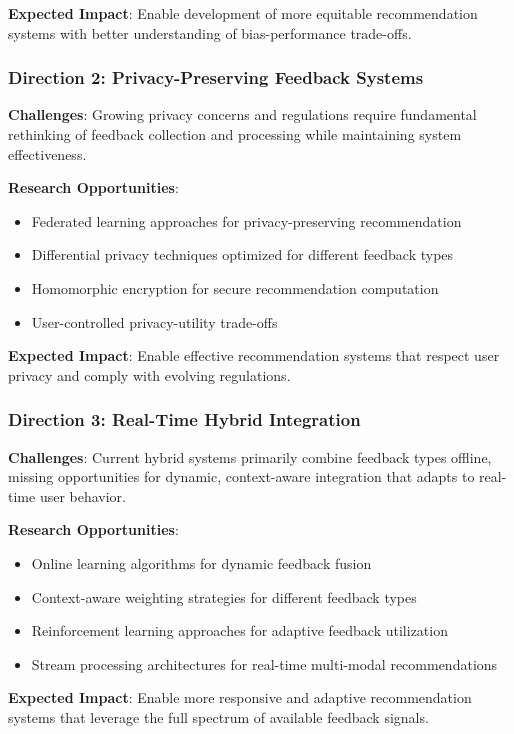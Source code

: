 \textbf{Expected Impact}: Enable development of more equitable recommendation systems with better understanding of bias-performance trade-offs.

\subsubsection{Direction 2: Privacy-Preserving Feedback Systems}

\textbf{Challenges}:
Growing privacy concerns and regulations require fundamental rethinking of feedback collection and processing while maintaining system effectiveness.

\textbf{Research Opportunities}:
\begin{itemize}
    \item Federated learning approaches for privacy-preserving recommendation
    \item Differential privacy techniques optimized for different feedback types
    \item Homomorphic encryption for secure recommendation computation
    \item User-controlled privacy-utility trade-offs
\end{itemize}

\textbf{Expected Impact}: Enable effective recommendation systems that respect user privacy and comply with evolving regulations.

\subsubsection{Direction 3: Real-Time Hybrid Integration}

\textbf{Challenges}:
Current hybrid systems primarily combine feedback types offline, missing opportunities for dynamic, context-aware integration that adapts to real-time user behavior.

\textbf{Research Opportunities}:
\begin{itemize}
    \item Online learning algorithms for dynamic feedback fusion
    \item Context-aware weighting strategies for different feedback types
    \item Reinforcement learning approaches for adaptive feedback utilization
    \item Stream processing architectures for real-time multi-modal recommendations
\end{itemize}

\textbf{Expected Impact}: Enable more responsive and adaptive recommendation systems that leverage the full spectrum of available feedback signals.

